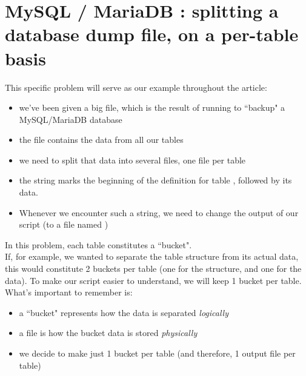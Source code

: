 
\renewcommand{\currentPart}{Splitting a MariaDB dump file, on a per-table basis}

\newpage
\part{MySQL / MariaDB : splitting a database dump file, on a per-table basis}

This specific problem will serve as our example throughout the article:

\begin{itemize}
	\item we've been given a big  file, which is the result of running \mysqldump to ``backup" a MySQL/MariaDB database
	\item the  file contains the data from all our tables
	\item we need to split that data into several  files, one file per table
	\item the string  marks the beginning of the definition for table , followed by its data. \
	\item Whenever we encounter such a string, we need to change the output of our script (to a file named )
\end{itemize}


In this problem, each table constitutes a ``bucket". \\

If, for example, we wanted to separate the table structure from its actual data, this would constitute 2 buckets per table (one for the structure, and one for the data). To make our script easier to understand, we will keep 1 bucket per table. \\

What's important to remember is:
\begin{itemize}
	\item a ``bucket" represents how the data is separated \emph{logically}
	\item a file is how the bucket data is stored \emph{physically}
	\item we decide to make just 1 bucket per table (and therefore, 1 output file per table)
\end{itemize}



\newpage

